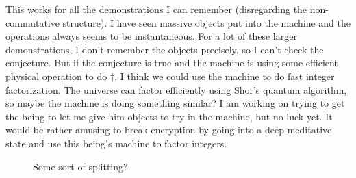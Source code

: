 \documentclass[12pt]{article}
\newcommand{\fancy}[1]{\mathcal{#1}}
\newcommand{\C}[1]{\fancy{C}_{#1}}
\def\C{\fancy{C}}
\newcommand{\Bond}[6]%
{ \begin{pgfonlayer}{background}
        \colorlet{InColor}{#4}
        \colorlet{OutColor}{#5}
        \foreach \I in {#6,...,1}
        {   \pgfmathsetlengthmacro{\r}{#3/#6*\I}
            \pgfmathsetmacro{\C}{sqrt(1-\r*\r/#3/#3)*100}
            \draw[InColor!\C!OutColor, line width=\r] (#1.center) -- (#2.center);
        }
    \end{pgfonlayer}
}
\newcommand{\BlackBond}[2]%
{   \Bond{#1}{#2}{0.7071mm}{black!25}{black!25!black}{10}
}
\begin{document}
This works for all the demonstrations I can remember (disregarding the non-commutative structure).   I have seen massive objects put into the machine and the operations always seems to be instantaneous.  For a lot of these
larger demonstrations, I don't remember the objects precisely, so I can't check the conjecture.  But if the conjecture is true and the machine is using some efficient physical operation to do $\dagger$, I think we could
use the machine to do fast integer factorization.  The universe can factor efficiently using Shor's quantum algorithm, so maybe the machine is doing something similar?   I am working on trying to get the being to let me give 
him objects to try in the machine, but no luck yet.  It would be rather amusing to break encryption by going into a deep meditative state and use this being's machine to factor integers.

\begin{figure}\label{ManyFromFew}
\centering
{}
\caption{Some sort of splitting?}
\end{figure}
\end{document}
